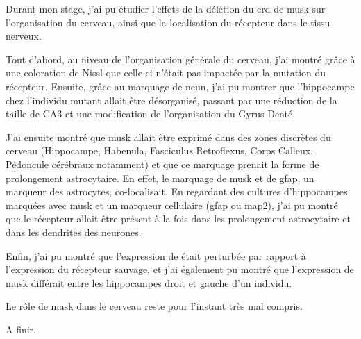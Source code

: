 	Durant mon stage, j'ai pu étudier l'effets de la délétion du \gls{crd} de \gls{musk} sur l'organisation du cerveau, ainsi que la localisation du récepteur dans le tissu nerveux.
	
	Tout d'abord, au niveau de l'organisation générale du cerveau, j'ai montré grâce à une coloration de Nissl que celle-ci n'était pas impactée par la mutation du récepteur. Ensuite, grâce au marquage de \gls{neun}, j'ai pu montrer que l'hippocampe chez l'individu mutant allait être désorganisé, passant par une réduction de la taille de CA3 et une modification de l'organisation du Gyrus Denté.
	
	J'ai ensuite montré que \gls{musk} allait être exprimé dans des zones discrètes du cerveau (Hippocampe, Habenula, Fasciculus Retroflexus, Corps Calleux, Pédoncule cérébraux notamment) et que ce marquage prenait la forme de prolongement astrocytaire. En effet, le marquage de \gls{musk} et de \gls{gfap}, un marqueur des astrocytes, co-localisait. En regardant des cultures d'hippocampes marquées avec \gls{musk} et un marqueur cellulaire (\gls{gfap} ou \gls{map2}), j'ai pu montré que le récepteur allait être présent à la fois dans les prolongement astrocytaire et dans les dendrites des neurones.
	
	Enfin, j'ai pu montré que l'expression de \mcrd était perturbée par rapport à l'expression du récepteur sauvage, et j'ai également pu montré que l'expression de \gls{musk} différait entre les hippocampes droit et gauche d'un individu.
	
	Le rôle de \gls{musk} dans le cerveau reste pour l'instant très mal compris. 
	
	A finir.
	
	